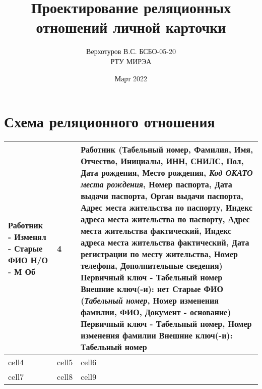 \documentclass[10pt,a4paper]{article}
\title{Проектирование реляционных отношений личной карточки}
\author{Верхотуров В.С. БСБО-05-20 \\ РТУ МИРЭА}
\date{Март 2022}
\newcommand{\pk}[1]{\textbf{#1}}
\newcommand{\fk}[1]{\textit{#1}}
\newcommand{\pfk}[1]{\pk{\fk{#1}}}
\newcommand{\firstColumn}[4]{#1 - #2 - #3 \newline #4}
\newcommand{\thirdColumn}[6]{#1 \newline Первичный ключ - #2 \newline Внешние ключ(-и): #3 \newline #4 \newline Первичный ключ - #5 \newline Внешние ключ(-и): #6}
\newcommand{\ruleOneOptionalManyMondatoryNum}{4}
\newcommand{\ruleOneOptionalManyMondatory}{1 Н/О - М Об}
\newcommand{\rabotnik}{Работник (\pk{Табельный номер}, Фамилия, Имя, Отчество, Инициалы, ИНН, СНИЛС, Пол, Дата рождения, Место рождения, \fk{Код ОКАТО места рождения}, Номер паспорта, Дата выдачи паспорта, Орган выдачи паспорта, Адрес места жительства по паспорту, Индекс адреса места жительства по паспорту, Адрес места жительства фактический, Индекс адреса места жительства фактический, Дата регистрации по месту жительства, Номер телефона, Дополнительные сведения)}
\newcommand{\starieFIO}{Старые ФИО (\pfk{Табельный номер}, \pk{Номер изменения фамилии}, ФИО, Документ - основание)}
\begin{document}
\maketitle

\section{Схема реляционного отношения}

\begin{center}
\begin{tabular}{ | m{10em} | m{1em}| m{30em} | } 
 \hline
 \firstColumn{Работник}{Изменял}{Старые ФИО}{\ruleOneOptionalManyMondatory} & \ruleOneOptionalManyMondatoryNum & \thirdColumn{\rabotnik}{Табельный номер}{нет}{\starieFIO}{Табельный номер, Номер изменения фамилии}{Табельный номер} \\ 
 
 \hline
 cell4 & cell5 & cell6 \\ 
 cell7 & cell8 & cell9 \\ 
 \hline
\end{tabular}
\end{center}
\end{document}
